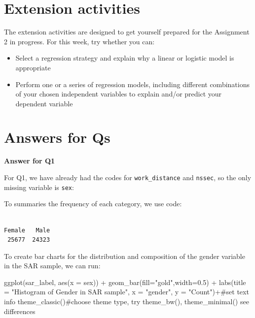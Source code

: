 \documentclass[
  letterpaper,
  DIV=11,
  numbers=noendperiod]{scrreprt}
\newenvironment{Shaded}{\begin{snugshade}}{\end{snugshade}}
\newcommand{\AttributeTok}[1]{\textcolor[rgb]{0.40,0.45,0.13}{#1}}
\newcommand{\CommentTok}[1]{\textcolor[rgb]{0.37,0.37,0.37}{#1}}
\newcommand{\FloatTok}[1]{\textcolor[rgb]{0.68,0.00,0.00}{#1}}
\newcommand{\FunctionTok}[1]{\textcolor[rgb]{0.28,0.35,0.67}{#1}}
\newcommand{\NormalTok}[1]{\textcolor[rgb]{0.00,0.23,0.31}{#1}}
\newcommand{\SpecialCharTok}[1]{\textcolor[rgb]{0.37,0.37,0.37}{#1}}
\newcommand{\StringTok}[1]{\textcolor[rgb]{0.13,0.47,0.30}{#1}}
\begin{document}
\section{\texorpdfstring{\textbf{Extension
activities}}{Extension activities}}\label{extension-activities-1}

The extension activities are designed to get yourself prepared for the
Assignment 2 in progress. For this week, try whether you can:

\begin{itemize}
\item
  Select a regression strategy and explain why a linear or logistic
  model is appropriate
\item
  Perform one or a series of regression models, including different
  combinations of your chosen independent variables to explain and/or
  predict your dependent variable
\end{itemize}

\section{\texorpdfstring{\textbf{Answers for
Qs}}{Answers for Qs}}\label{answers-for-qs}

\textbf{Answer for Q1}

For Q1, we have already had the codes for \texttt{work\_distance} and
\texttt{nssec}, so the only missing variable is \texttt{sex}:

To summaries the frequency of each category, we use code:

\begin{Shaded}
\end{Shaded}

\begin{verbatim}

Female   Male 
 25677  24323 
\end{verbatim}

To create bar charts for the distribution and composition of the gender
variable in the SAR sample, we can run:

\begin{Shaded}
\begin{Highlighting}[]
\FunctionTok{ggplot}\NormalTok{(sar\_label, }\FunctionTok{aes}\NormalTok{(}\AttributeTok{x =}\NormalTok{ sex)) }\SpecialCharTok{+}
  \FunctionTok{geom\_bar}\NormalTok{(}\AttributeTok{fill=}\StringTok{"gold"}\NormalTok{,}\AttributeTok{width=}\FloatTok{0.5}\NormalTok{) }\SpecialCharTok{+}
  \FunctionTok{labs}\NormalTok{(}\AttributeTok{title =} \StringTok{"Histogram of Gender in SAR sample"}\NormalTok{, }\AttributeTok{x =} \StringTok{"gender"}\NormalTok{, }\AttributeTok{y =} \StringTok{"Count"}\NormalTok{)}\SpecialCharTok{+}\CommentTok{\#set text info}
  \FunctionTok{theme\_classic}\NormalTok{()}\CommentTok{\#choose theme type, try theme\_bw(), theme\_minimal() see differences}
\end{Highlighting}
\end{Shaded}
\end{document}
